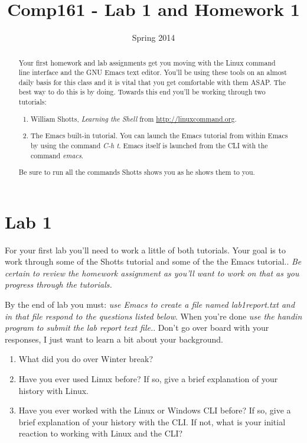 \documentclass[]{tufte-handout}
\title{Comp161 - Lab 1 and Homework 1}
\author{}
\date{ Spring 2014 }
\begin{document}
\maketitle

\begin{abstract}
Your first homework and lab assignments get you moving with the Linux command line interface and the GNU Emacs text editor.  You'll be using these tools on an almost daily basis for this class and it is vital that you get comfortable with them ASAP. The best way to do this is by doing.  Towards this end you'll be working through two tutorials:
\begin{enumerate}
\item William Shotts, \textit{Learning the Shell} from \url{http://linuxcommand.org}.
\item The Emacs built-in tutorial. You can launch the Emacs tutorial from within Emacs by using the command \textit{C-h t}.  Emacs itself is launched from the CLI with the command \textit{emacs}.
\end{enumerate}
Be sure to run all the commands Shotts shows you as he shows them to you.
\end{abstract}


\section{Lab 1}

For your first lab you'll need to work a little of both tutorials.  Your goal is to work through some of the  Shotts tutorial and some of the the Emacs tutorial..  \textit{Be certain to review the homework assignment as you'll want to work on that as you progress through the tutorials.} 

By the end of lab you must: \textit{use Emacs to create a file named lab1report.txt and in that file respond to the questions listed below}. When you're done \textit{use the \textit{handin} program}\textit{ to submit the lab report text file.}.  Don't go over board with your responses, I just want to learn a bit about your background.
\begin{enumerate}
\item What did you do over Winter break?
\item Have you ever used Linux before? If so, give a brief explanation of your history with Linux.
\item Have you ever worked with the Linux or Windows CLI before? If so, give a brief explanation of your history with the CLI. If not, what is your initial reaction to working with Linux and the CLI?
\end{enumerate}
\end{document}
